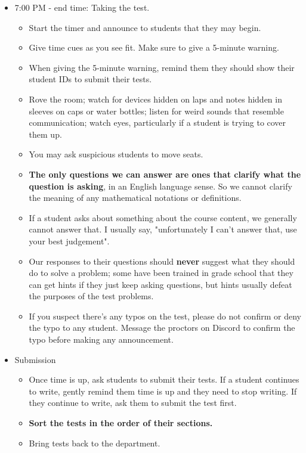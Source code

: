 \documentclass[11pt]{article}
\begin{document}
\begin{itemize}
\item 7:00 PM - end time: Taking the test.
    \begin{itemize}
    \item Start the timer and announce to students that they may begin.
    \item Give time cues as you see fit. Make sure to give a 5-minute warning. %
    \item When giving the 5-minute warning, remind them they should show their student IDs to submit their tests.
    \item Rove the room; watch for devices hidden on laps and notes hidden in sleeves on caps or water bottles; listen for weird sounds that resemble communication; watch eyes, particularly if a student is trying to cover them up.
    \item You may ask suspicious students to move seats.
    \item {\bf The only questions we can answer are ones that clarify what the question is asking}, in an English language sense. So we cannot clarify the meaning of any mathematical notations or definitions.
    \item If a student asks about something about the course content, we generally cannot answer that. I usually say, "unfortunately I can't answer that, use your best judgement".
    \item Our responses to their questions should {\bf never} suggest what they should do to solve a problem; some have been trained in grade school that they can get hints if they just keep asking questions, but hints usually defeat the purposes of the test problems.
    \item If you suspect there's any typos on the test, please do not confirm or deny the typo to any student. Message the proctors on Discord to confirm the typo before making any announcement.
    \end{itemize}
    
\item Submission
    \begin{itemize}
    \item Once time is up, ask students to submit their tests. If a student continues to write, gently remind them time is up and they need to stop writing. If they continue to write, ask them to submit the test first. %
    \item \textbf{Sort the tests in the order of their sections.}
    \item Bring tests back to the department.
    \end{itemize}
    

\end{itemize}
\end{document}
